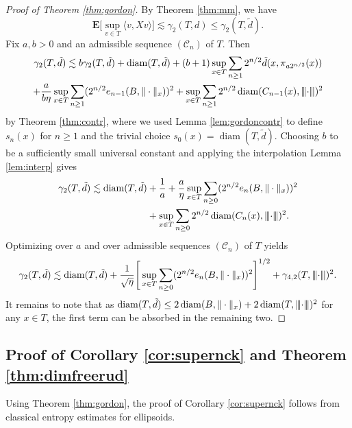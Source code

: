 \documentclass[10pt,reqno]{amsart}
\theoremstyle{definition}
\numberwithin{equation}{section}
\numberwithin{figure}{section}
\numberwithin{table}{section}
\newcommand{\diam}{\mathop{\mathrm{diam}}}
\newcommand{\mynegspace}{\hspace{-0.12em}}
\newcommand{\vvv}{\rvert\mynegspace\rvert\mynegspace\rvert}
\newcommand{\nnn}[1]{{\vvv #1 \vvv}}
\begin{document}
\begin{proof}[Proof of Theorem \ref{thm:gordon}]
By Theorem \ref{thm:mm}, we have
$$
	\mathbf{E}\bigg[\sup_{v\in T}\langle v,Xv\rangle\bigg]
	\lesssim
	\gamma_2(T,d) \le \gamma_2(T,\tilde d).
$$
Fix $a,b>0$ and an admissible sequence $(\mathcal{C}_n)$ of $T$. Then
\begin{multline*}
	\gamma_2(T,\tilde d) \lesssim
	b\gamma_2(T,\tilde d) +
	\diam(T,\tilde d) +
	(b+1)\sup_{x\in T}\sum_{n\ge 1}2^{n/2}\tilde d(x,\pi_{a2^{n/2}}(x))
	\\
	+ \frac{a}{b\eta}\sup_{x\in T}\sum_{n\ge 1}
	(2^{n/2}e_{n-1}(B,\|\cdot\|_x))^2
	+ \sup_{x\in T}\sum_{n\ge 1}2^{n/2}
	\diam(C_{n-1}(x),\nnn{\cdot})^2
\end{multline*}
by Theorem \ref{thm:contr}, where we used Lemma \ref{lem:gordoncontr}
to define $s_n(x)$ for $n\ge 1$ and the trivial choice 
$s_0(x)=\diam(T,\tilde d)$. Choosing $b$ to be a sufficiently small 
universal constant and applying the interpolation Lemma \ref{lem:interp}
gives
\begin{align*}
	\gamma_2(T,\tilde d) \lesssim
	\diam(T,\tilde d) &+
	\frac{1}{a} +
	\frac{a}{\eta}\sup_{x\in T}\sum_{n\ge 0}
        (2^{n/2}e_n(B,\|\cdot\|_x))^2 \\
        &+ \sup_{x\in T}\sum_{n\ge 0}2^{n/2}
        \diam(C_n(x),\nnn{\cdot})^2.
\end{align*}
Optimizing over $a$ and over admissible sequences $(\mathcal{C}_n)$ of $T$
yields
$$
	\gamma_2(T,\tilde d)\lesssim
	\diam(T,\tilde d)+
	\frac{1}{\sqrt{\eta}}
	\Bigg[\sup_{x\in T}\sum_{n\ge 0}
        (2^{n/2}e_n(B,\|\cdot\|_x))^2\Bigg]^{1/2}
	+ \gamma_{4,2}(T,\nnn{\cdot})^2.
$$
It remains to note that as $\diam(T,\tilde d)\le
2\diam(B,\|\cdot\|_x) + 2\diam(T,\nnn{\cdot})^2$ for any $x\in T$,
the first term can be absorbed in the remaining two.
\end{proof}


\subsection{Proof of Corollary \ref{cor:supernck} and Theorem \ref{thm:dimfreerud}}

Using Theorem \ref{thm:gordon}, the proof of Corollary \ref{cor:supernck} 
follows from classical entropy estimates for ellipsoids.
\end{document}

